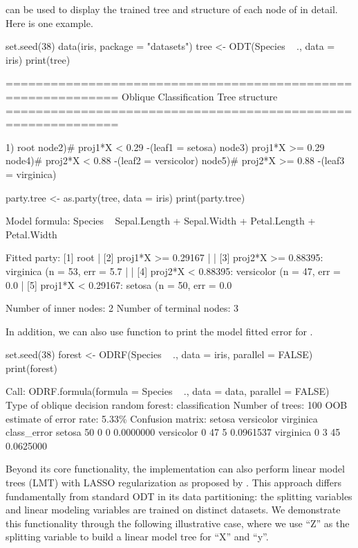   can be used to display the trained tree and structure of each node  of  in detail.  Here is one example.
\begin{example}
set.seed(38)
data(iris, package = "datasets")
tree <- ODT(Species ~ ., data = iris)
print(tree)
\end{example}
\begin{example}
============================================================= 
Oblique Classification Tree structure 
=============================================================

1) root
node2)# proj1*X < 0.29 -(leaf1 = setosa)
node3)  proj1*X >= 0.29
node4)# proj2*X < 0.88 -(leaf2 = versicolor)
node5)# proj2*X >= 0.88 -(leaf3 = virginica)
\end{example}
\begin{example}
party.tree <- as.party(tree, data = iris)
print(party.tree)
\end{example}
\begin{example}
Model formula:
Species ~ Sepal.Length + Sepal.Width + Petal.Length + Petal.Width

Fitted party:
[1] root
|   [2] proj1*X >= 0.29167
|   |   [3] proj2*X >= 0.88395: virginica (n = 53, err = 5.7%
|   |   [4] proj2*X < 0.88395: versicolor (n = 47, err = 0.0%
|   [5] proj1*X < 0.29167: setosa (n = 50, err = 0.0%

Number of inner nodes:    2
Number of terminal nodes: 3
\end{example}
In addition, we can also use function  to print the model fitted error for .
\begin{example}
set.seed(38)
forest <- ODRF(Species ~ ., data = iris, parallel = FALSE)
print(forest)
\end{example}
\begin{example}
Call:
ODRF.formula(formula = Species ~ ., data = data, parallel = FALSE) 
Type of oblique decision random forest: classification
Number of trees: 100
OOB estimate of error rate: 5.33\%
Confusion matrix:
          setosa versicolor virginica class_error
setosa        50          0         0    0.0000000
versicolor     0         47         5    0.0961537
virginica      0          3        45    0.0625000
\end{example}
Beyond its core functionality, the  implementation can also perform linear model trees (LMT) with LASSO regularization as proposed by \citet{ptLASSO}. This approach differs fundamentally from standard ODT in its data partitioning: the splitting variables and linear modeling variables are trained on distinct datasets. We demonstrate this functionality through the following illustrative case, where we use ``Z'' as the splitting variable to build a linear model tree for ``X'' and ``y''.
